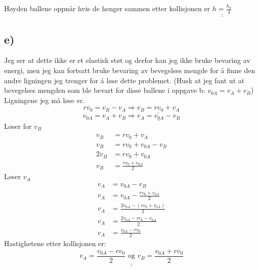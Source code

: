 \documentclass[a4paper,12pt,norsk]{article}
\begin{document}
Høyden ballene oppnår hvis de henger sammen etter kollisjonen er $\underline{\underline{h = \frac{h_0}{4}}}$

\subsection*{e)}
Jeg ser at dette ikke er et elastisk støt og derfor kan jeg ikke bruke bevaring av energi, men jeg kan fortsatt bruke bevaring av bevegelses mengde for å finne den andre ligningen jeg trenger for å løse dette problemet. (Husk at jeg fant ut at bevegelses mengden som ble bevart for disse ballene i oppgave b: $v_{0A} = v_A + v_B$) Ligningene jeg må løse er. 
$$rv_0 = v_B - v_A \Rightarrow \underline{v_B = rv_0 + v_A}$$
$$v_{0A} = v_A + v_B \Rightarrow \underline{v_A = v_{0A} - v_B}$$
Løser for $v_B$
\begin{align*}
v_B &= rv_0 + v_A\\
v_B &= rv_0 + v_{0A} - v_B\\
2v_B &= rv_0 +v_{0A}\\
v_B &= \frac{rv_0 +v_{0A}}{2}
\end{align*}
Løser $v_A$
\begin{align*}
v_A &= v_{0A} - v_B\\
v_A &= v_{0A} - \frac{rv_0 + v_{0A}}{2}\\
v_A &= \frac{2v_{0A} - (rv_0 + v_{0A})}{2}\\
v_A &= \frac{2v_{0A} - rv_0 - v_{0A}}{2}\\
v_A &= \frac{v_{0A} - rv_0}{2}
\end{align*}
Hastighetene etter kollisjonen er:
$$\underline{\underline{v_A = \frac{v_{0A} - rv_0}{2} \textrm{ og } v_B = \frac{v_{0A}+rv_0}{2}}}$$
\end{document}
